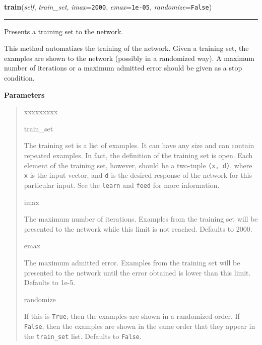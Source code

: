     \label{peach:nn:nn:FeedForward:train}

    \vspace{0.5ex}

    \begin{boxedminipage}{\textwidth}

    \raggedright \textbf{train}(\textit{self}, \textit{train\_set}, \textit{imax}=\texttt{2000}, \textit{emax}=\texttt{1e-05}, \textit{randomize}=\texttt{False})

    \vspace{-1.5ex}

    \rule{\textwidth}{0.5\fboxrule}

Presents a training set to the network.

This method automatizes the training of the network. Given a training
set, the examples are shown to the network (possibly in a randomized
way). A maximum number of iterations or a maximum admitted error should
be given as a stop condition.
    \vspace{1ex}

      \textbf{Parameters}
      \begin{quote}
        \begin{Ventry}{xxxxxxxxx}

          \item[train\_set]


The training set is a list of examples. It can have any size and can
contain repeated examples. In fact, the definition of the training
set is open. Each element of the training set, however, should be a
two-tuple \texttt{(x, d)}, where \texttt{x} is the input vector, and \texttt{d} is
the desired response of the network for this particular input. See
the \texttt{learn} and \texttt{feed} for more information.
          \item[imax]


The maximum number of iterations. Examples from the training set
will be presented to the network while this limit is not reached.
Defaults to 2000.
          \item[emax]


The maximum admitted error. Examples from the training set will be
presented to the network until the error obtained is lower than this
limit. Defaults to 1e-5.
          \item[randomize]


If this is \texttt{True}, then the examples are shown in a randomized
order. If \texttt{False}, then the examples are shown in the same order
that they appear in the \texttt{train{\_}set} list. Defaults to \texttt{False}.
        \end{Ventry}

      \end{quote}

    \vspace{1ex}

    \end{boxedminipage}

